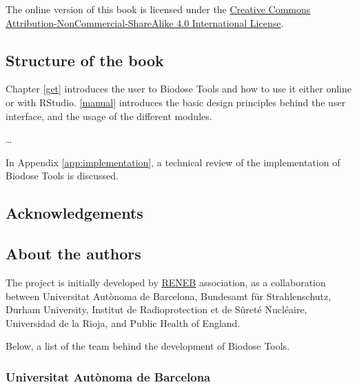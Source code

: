 \documentclass[]{scrartcl}
\begin{document}
The online version of this book is licensed under the \href{http://creativecommons.org/licenses/by-nc-sa/4.0/}{Creative Commons Attribution-NonCommercial-ShareAlike 4.0 International License}.

\hypertarget{structure-of-the-book}{%
\subsection*{Structure of the book}\label{structure-of-the-book}}

Chapter \ref{get} introduces the user to Biodose Tools and how to use it either online or with RStudio. \ref{manual} introduces the basic design principles behind the user interface, and the usage of the different modules.

\ldots{}

In Appendix \ref{app:implementation}, a technical review of the implementation of Biodose Tools is discussed.

\hypertarget{acknowledgements}{%
\subsection*{Acknowledgements}\label{acknowledgements}}

\hypertarget{about-the-authors}{%
\subsection*{About the authors}\label{about-the-authors}}

The project is initially developed by \href{http://www.reneb.net}{RENEB} association, as a collaboration between Universitat Autònoma de Barcelona, Bundesamt für Strahlenschutz, Durham University, Institut de Radioprotection et de Sûreté Nucléaire, Universidad de la Rioja, and Public Health of England.

Below, a list of the team behind the development of Biodose Tools.

\hypertarget{universitat-autonoma-de-barcelona}{%
\subsubsection*{Universitat Autònoma de Barcelona}\label{universitat-autonoma-de-barcelona}}
\end{document}
